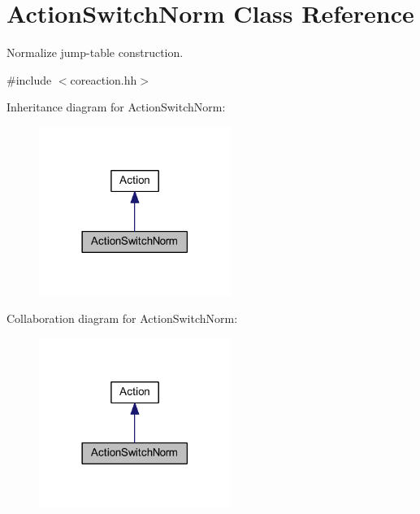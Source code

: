 \hypertarget{class_action_switch_norm}{}\section{Action\+Switch\+Norm Class Reference}
\label{class_action_switch_norm}


Normalize jump-\/table construction.  




{\ttfamily \#include $<$coreaction.\+hh$>$}



Inheritance diagram for Action\+Switch\+Norm\+:
\nopagebreak
\begin{figure}[H]
\begin{center}
\leavevmode
\includegraphics[width=177pt]{class_action_switch_norm__inherit__graph}
\end{center}
\end{figure}


Collaboration diagram for Action\+Switch\+Norm\+:
\nopagebreak
\begin{figure}[H]
\begin{center}
\leavevmode
\includegraphics[width=177pt]{class_action_switch_norm__coll__graph}
\end{center}
\end{figure}
